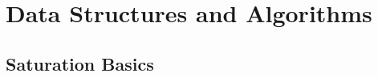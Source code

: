 
\chapter{Data Structures and Algorithms}















\section{Saturation Basics}\label{sec:saturation:basics}

